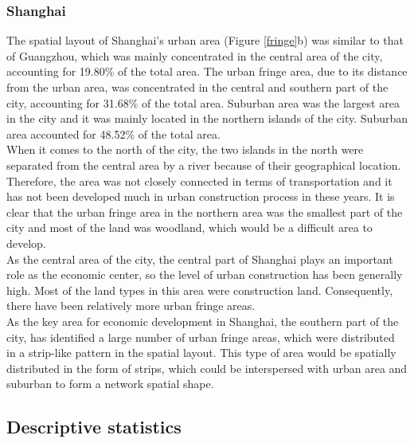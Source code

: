 \subsubsection{Shanghai}
The spatial layout of Shanghai's urban area (Figure \ref{fringe}b) was similar to that of Guangzhou, which was mainly concentrated in the central area of the city, accounting for 19.80\% of the total area. The urban fringe area, due to its distance from the urban area, was concentrated in the central and southern part of the city, accounting for 31.68\% of the total area. Suburban area was the largest area in the city and it was mainly located in the northern islands of the city. Suburban area accounted for 48.52\% of the total area.\\

When it comes to the north of the city, the two islands in the north were separated from the central area by a river because of their geographical location. Therefore, the area was not closely connected in terms of transportation and it has not been developed much in urban construction process in these years. It is clear that the urban fringe area in the northern area was the smallest part of the city and most of the land was woodland, which would be a difficult area to develop.\\

As the central area of the city, the central part of Shanghai plays an important role as the economic center, so the level of urban construction has been generally high. Most of the land types in this area were construction land. Consequently, there have been relatively more urban fringe areas.\\

As the key area for economic development in Shanghai, the southern part of the city, has identified a large number of urban fringe areas, which were distributed in a strip-like pattern in the spatial layout. This type of area would be spatially distributed in the form of strips, which could be interspersed with urban area and suburban to form a network spatial shape.\\


\subsection{Descriptive statistics}


